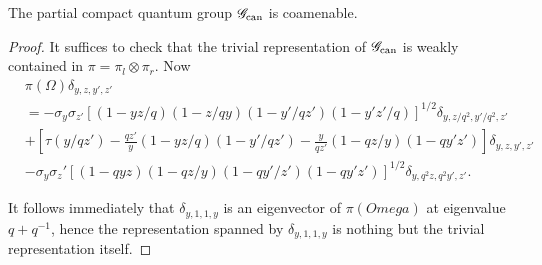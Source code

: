 \begin{Theorem} The partial compact quantum group $\mathscr{G}_{\operatorname{\mathrm{can}}}$ is coamenable.
\end{Theorem}
\begin{proof} It suffices to check that the trivial representation of $\mathscr{G}_{\operatorname{\mathrm{can}}}$ is weakly contained in $\pi = \pi_l\otimes \pi_r$. Now \begin{align*} &\pi(\Omega)\delta_{y,z,y',z'} \\ &= -\sigma_y\sigma_{z'} \left[(1-yz/q)(1-z/qy)(1-y'/qz')(1-y'z'/q)\right]^{1/2} \delta_{y,z/q^2,y'/q^2,z'} \\ &+ \left[\tau(y/qz') -\frac{qz'}{y}(1-yz/q)(1-y'/qz') -\frac{y}{qz'}(1-qz/y)(1-qy'z')\right]\delta_{y,z,y',z'} \\ & - \sigma_y\sigma_z'\left[(1-qyz)(1-qz/y)(1-qy'/z')(1-qy'z')\right]^{1/2}\delta_{y,q^2z,q^2y',z'}.\end{align*} 

It follows immediately that $\delta_{y,1,1,y}$ is an eigenvector of $\pi(Omega)$ at eigenvalue $q+q^{-1}$, hence the representation spanned by $\delta_{y,1,1,y}$ is nothing but the trivial representation itself. 
\end{proof} 







